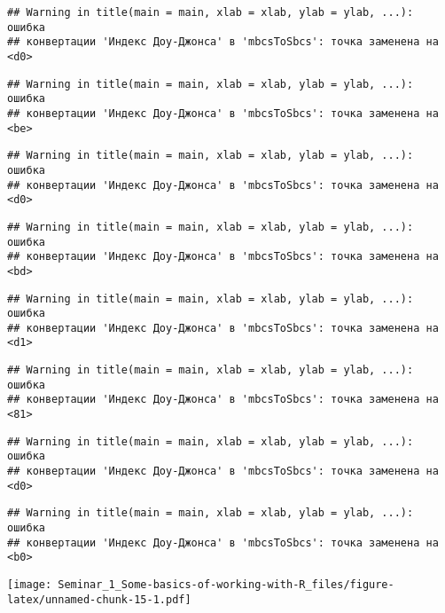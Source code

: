 \documentclass[
]{article}
\newenvironment{Shaded}{\begin{snugshade}}{\end{snugshade}}
\newcommand{\AttributeTok}[1]{\textcolor[rgb]{0.13,0.29,0.53}{#1}}
\newcommand{\FunctionTok}[1]{\textcolor[rgb]{0.13,0.29,0.53}{\textbf{#1}}}
\newcommand{\NormalTok}[1]{#1}
\newcommand{\SpecialCharTok}[1]{\textcolor[rgb]{0.81,0.36,0.00}{\textbf{#1}}}
\newcommand{\StringTok}[1]{\textcolor[rgb]{0.31,0.60,0.02}{#1}}
\begin{document}
\begin{verbatim}
## Warning in title(main = main, xlab = xlab, ylab = ylab, ...): ошибка
## конвертации 'Индекс Доу-Джонса' в 'mbcsToSbcs': точка заменена на <d0>
\end{verbatim}

\begin{verbatim}
## Warning in title(main = main, xlab = xlab, ylab = ylab, ...): ошибка
## конвертации 'Индекс Доу-Джонса' в 'mbcsToSbcs': точка заменена на <be>
\end{verbatim}

\begin{verbatim}
## Warning in title(main = main, xlab = xlab, ylab = ylab, ...): ошибка
## конвертации 'Индекс Доу-Джонса' в 'mbcsToSbcs': точка заменена на <d0>
\end{verbatim}

\begin{verbatim}
## Warning in title(main = main, xlab = xlab, ylab = ylab, ...): ошибка
## конвертации 'Индекс Доу-Джонса' в 'mbcsToSbcs': точка заменена на <bd>
\end{verbatim}

\begin{verbatim}
## Warning in title(main = main, xlab = xlab, ylab = ylab, ...): ошибка
## конвертации 'Индекс Доу-Джонса' в 'mbcsToSbcs': точка заменена на <d1>
\end{verbatim}

\begin{verbatim}
## Warning in title(main = main, xlab = xlab, ylab = ylab, ...): ошибка
## конвертации 'Индекс Доу-Джонса' в 'mbcsToSbcs': точка заменена на <81>
\end{verbatim}

\begin{verbatim}
## Warning in title(main = main, xlab = xlab, ylab = ylab, ...): ошибка
## конвертации 'Индекс Доу-Джонса' в 'mbcsToSbcs': точка заменена на <d0>
\end{verbatim}

\begin{verbatim}
## Warning in title(main = main, xlab = xlab, ylab = ylab, ...): ошибка
## конвертации 'Индекс Доу-Джонса' в 'mbcsToSbcs': точка заменена на <b0>
\end{verbatim}

\texttt{[image: Seminar\_1\_Some-basics-of-working-with-R\_files/figure-latex/unnamed-chunk-15-1.pdf]}

\begin{Shaded}
\end{Shaded}
\end{document}
